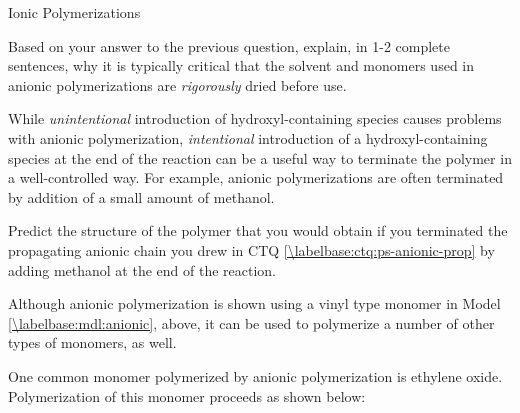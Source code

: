 \begin{activity}{Ionic Polymerizations}
\begin{ctqs}
	\question Based on your answer to the previous question, explain, in 1-2 complete sentences, why it is typically critical that the solvent and monomers used in anionic polymerizations are \emph{rigorously} dried before use.
	
		\begin{solution}[1.25in]
		\end{solution}
	
\end{ctqs}

\begin{infobox}

	While \emph{unintentional} introduction of hydroxyl-containing species causes problems with anionic polymerization, \emph{intentional} introduction of a hydroxyl-containing species at the end of the reaction can be a useful way to terminate the polymer in a well-controlled way.  For example, anionic polymerizations are often terminated by addition of a small amount of methanol.

\end{infobox}

\begin{ctqs}

	\question Predict the structure of the polymer that you would obtain if you terminated the propagating anionic chain you drew in CTQ \ref{\labelbase:ctq:ps-anionic-prop} by adding methanol at the end of the reaction.
	
		\begin{solution}[2in]
		\end{solution}

		
\end{ctqs}


\clearpage
\begin{model}
	\label{\labelbase:mdl:anionicEO}

	Although anionic polymerization is shown using a vinyl type monomer in Model \ref{\labelbase:mdl:anionic}, above, it can be used to polymerize a number of other types of monomers, as well.
	
	One common monomer polymerized by anionic polymerization is ethylene oxide.  Polymerization of this monomer proceeds as shown below:
	

\end{model}
\end{activity}
